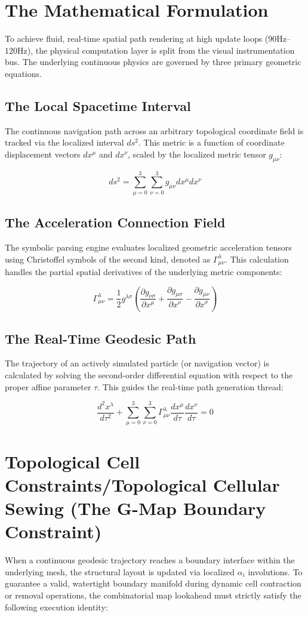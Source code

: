 \section{The Mathematical Formulation}

To achieve fluid, real-time spatial path rendering at high update loops ($90\text{Hz}$--$120\text{Hz}$), the physical computation layer is split from the visual instrumentation bus. The underlying continuous physics are governed by three primary geometric equations.

\subsection{The Local Spacetime Interval}
The continuous navigation path across an arbitrary topological coordinate field is tracked via the localized interval $ds^2$. This metric is a function of coordinate displacement vectors $dx^\mu$ and $dx^\nu$, scaled by the localized metric tensor $g_{\mu\nu}$:

\[
ds^2 = \sum_{\mu=0}^{3} \sum_{\nu=0}^{3} g_{\mu\nu} dx^\mu dx^\nu
\]

\subsection{The Acceleration Connection Field}
The symbolic parsing engine evaluates localized geometric acceleration tensors using Christoffel symbols of the second kind, denoted as $\Gamma^\lambda_{\mu\nu}$. This calculation handles the partial spatial derivatives of the underlying metric components:

\[
\Gamma^\lambda_{\mu\nu} = \frac{1}{2} g^{\lambda\sigma} \left( \frac{\partial g_{\nu\sigma}}{\partial x^\mu} + \frac{\partial g_{\mu\sigma}}{\partial x^\nu} - \frac{\partial g_{\mu\nu}}{\partial x^\sigma} \right)
\]

\subsection{The Real-Time Geodesic Path}
The trajectory of an actively simulated particle (or navigation vector) is calculated by solving the second-order differential equation with respect to the proper affine parameter $\tau$. This guides the real-time path generation thread:

\[
\frac{d^2 x^\lambda}{d\tau^2} + \sum_{\mu=0}^{3} \sum_{\nu=0}^{3} \Gamma^\lambda_{\mu\nu} \frac{dx^\mu}{d\tau} \frac{dx^\nu}{d\tau} = 0
\]

\section{Topological Cell Constraints/Topological Cellular Sewing (The G-Map Boundary Constraint)}
When a continuous geodesic trajectory reaches a boundary interface within the underlying mesh, the structural layout is updated via localized $\alpha_i$ involutions. To guarantee a valid, watertight boundary manifold during dynamic cell contraction or removal operations, the combinatorial map lookahead must strictly satisfy the following execution identity:

